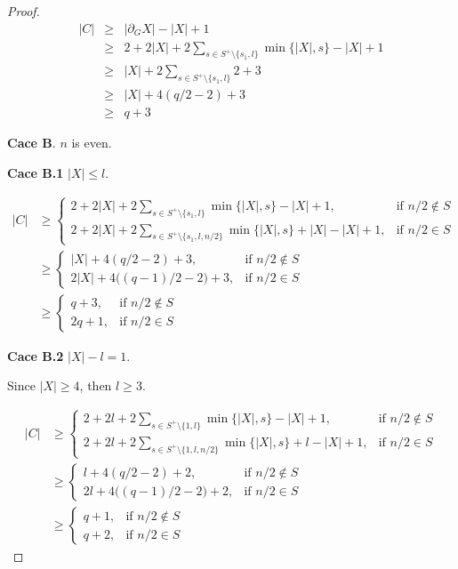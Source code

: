 \documentclass{article}
\begin{document}
\begin{proof}
\begin{eqnarray*}
|C| &\geq& |\partial_G X|-|X|+1 \\
&\geq &2+2|X|+2\sum\limits_{s\in S^+\setminus\{s_1,l\}}\min\{|X|,s\}-|X|+1\\
&\geq &|X|+2\sum\limits_{s\in S^+\setminus\{s_1,l\}}2+3\\
&\geq &|X|+4(q/2-2)+3\\
&\geq &q+3
\end{eqnarray*}

{\bf Cace B}. $n$ is even.

{\bf Cace B.1}  $|X|\le l$.

\begin{align*}
|C| &\geq 
\begin{cases}
\displaystyle 2 + 2|X| + 2\sum_{s\in S^+\setminus\{s_1,l\}} \min\{|X|,s\} - |X| + 1, & \text{if } n/2\notin S\\[4pt]
\displaystyle 2 + 2|X| + 2\sum_{s\in S^+\setminus\{s_1,l,n/2\}} \min\{|X|,s\} + |X| - |X| + 1, & \text{if } n/2\in S
\end{cases} \\
&\geq 
\begin{cases}
\displaystyle |X| + 4(q/2-2) + 3, & \text{if } n/2\notin S\\[4pt]
\displaystyle 2|X| + 4\big((q-1)/2-2\big) + 3, & \text{if } n/2\in S
\end{cases} \\
&\geq 
\begin{cases}
\displaystyle q + 3, & \text{if } n/2\notin S\\[4pt]
\displaystyle 2q + 1, & \text{if } n/2\in S
\end{cases}
\end{align*}

{\bf Cace B.2}  $|X|- l=1$.

Since $|X|\geq4$, then $l\geq3$.

\begin{align*}
|C| &\geq 
\begin{cases}
\displaystyle 2 + 2l + 2\sum_{s\in S^+\setminus\{1,l\}} \min\{|X|,s\} - |X| + 1, & \text{if } n/2\notin S\\[4pt]
\displaystyle 2 + 2l + 2\sum_{s\in S^+\setminus\{1,l,n/2\}} \min\{|X|,s\} + l - |X| + 1, & \text{if } n/2\in S
\end{cases} \\
&\geq 
\begin{cases}
\displaystyle l + 4(q/2-2) + 2, & \text{if } n/2\notin S\\[4pt]
\displaystyle 2l + 4\big((q-1)/2-2\big) + 2, & \text{if } n/2\in S
\end{cases} \\
&\geq 
\begin{cases}
\displaystyle q + 1, & \text{if } n/2\notin S\\[4pt]
\displaystyle q + 2, & \text{if } n/2\in S
\end{cases}
\end{align*}


\end{proof}
\end{document}

